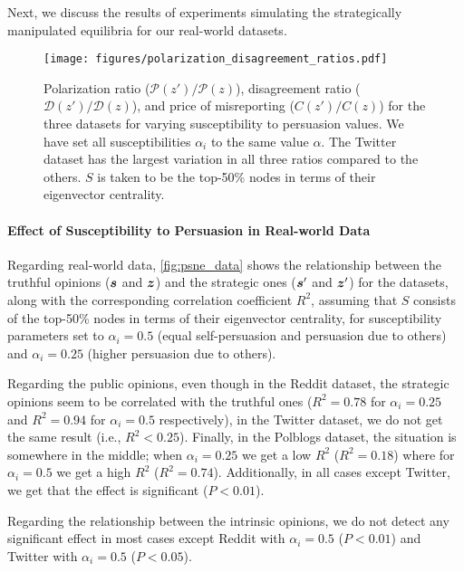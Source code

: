  Next, we discuss the results of experiments simulating the strategically manipulated equilibria for our real-world datasets. 

\begin{figure}[t]
    \centering
    \texttt{[image: figures/polarization\_disagreement\_ratios.pdf]}
    \caption{Polarization ratio ($\mathcal P(z')/\mathcal P(z)$), disagreement ratio ($\mathcal D(z') / \mathcal D(z)$), and price of misreporting ($C(z') / C(z)$) for the three datasets for varying susceptibility to persuasion values. We have set all susceptibilities $\alpha_i$ to the same value $\alpha$. The Twitter dataset has the largest variation in all three ratios compared to the others. $S$ is taken to be the top-50\% nodes in terms of their eigenvector centrality.}
    \label{fig:ratios_susceptibility_to_persuation}
\end{figure}



\paragraph{Effect of Susceptibility to Persuasion in Real-world Data} Regarding real-world data, \cref{fig:psne_data} shows the relationship between the truthful opinions ($\bm{s}$ and $\bm{z}$) and the strategic ones ($\bm{s}^\prime$ and $\bm{z}^\prime$) for the datasets, along with the corresponding correlation coefficient $R^2$, assuming that $S$ consists of the top-50\% nodes in terms of their eigenvector centrality, for susceptibility parameters set to $\alpha_i = 0.5$ (equal self-persuasion and persuasion due to others) and $\alpha_i = 0.25$ (higher persuasion due to others). 

Regarding the public opinions, even though in the Reddit dataset, the strategic opinions seem to be correlated with the truthful ones ($R^2 = 0.78$ for $\alpha_i = 0.25$ and $R^2 = 0.94$ for $\alpha_i = 0.5$ respectively), in the Twitter dataset, we do not get the same result (i.e., $R^2 < 0.25$). Finally, in the Polblogs dataset, the situation is somewhere in the middle; when $\alpha_i = 0.25$ we get a low $R^2$ ($R^2 = 0.18$) where for $\alpha_i = 0.5$ we get a high $R^2$ ($R^2 = 0.74$). Additionally, in all cases except Twitter, we get that the effect is significant ($P < 0.01$). 

Regarding the relationship between the intrinsic opinions, we do not detect any significant effect in most cases except Reddit with $\alpha_i = 0.5$ ($P < 0.01$) and Twitter with $\alpha_i = 0.5$ ($P < 0.05$).

